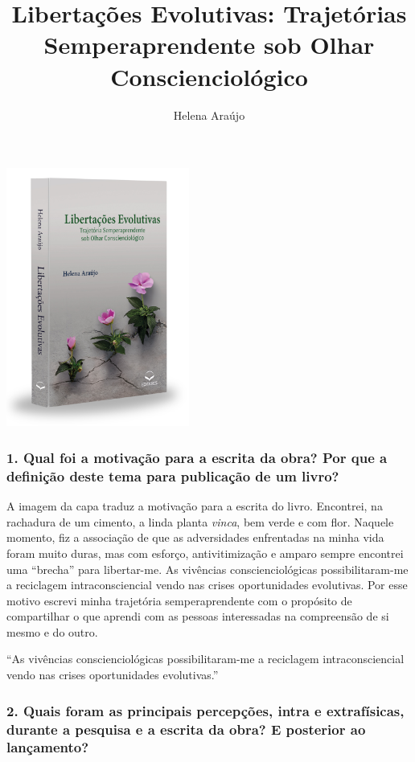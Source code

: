 \documentclass{gescons}
\author{Helena Araújo}
\title{Libertações Evolutivas: Trajetórias Semperaprendente sob Olhar Conscienciológico}
\begin{document}
    \makeentrevistatitle

    \begin{multicols}{2}

\begin{center}
    \includegraphics[width=6cm]{articles/entrevista/mockups/Helena_Araujo.png}
\end{center}


\subsubsection{1. Qual foi a motivação para a escrita da obra? Por que a definição deste tema para publicação de um livro?}

A imagem da capa traduz a motivação para a escrita do livro. Encontrei, na rachadura de um cimento, a linda planta \emph{vinca}, bem verde e com flor. Naquele momento, fiz a associação de que as adversidades enfrentadas na minha vida foram muito duras, mas com esforço, antivitimização e amparo sempre encontrei uma ``brecha'' para libertar-me. As vivências conscienciológicas possibilitaram-me a reciclagem intraconsciencial vendo nas crises oportunidades evolutivas. Por esse motivo escrevi minha trajetória semperaprendente com o propósito de compartilhar o que aprendi com as pessoas interessadas na compreensão de si mesmo e do outro.

\begin{pullquote}
``As vivências conscienciológicas possibilitaram-me a reciclagem intraconsciencial vendo nas crises oportunidades evolutivas.''
\end{pullquote}

\subsubsection{2. Quais foram as principais percepções, intra e extrafísicas, durante a pesquisa e a escrita da obra? E posterior ao lançamento?}


\end{multicols}
\end{document}
